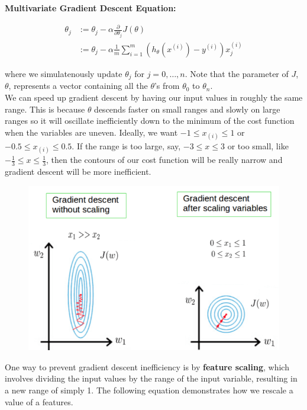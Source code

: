 \documentclass{article}
\begin{document}
        \noindent \textbf{Multivariate Gradient Descent Equation:}

        \begin{align*}
            \theta_j &:= \theta_j-\alpha\frac{\partial}{\partial\theta_j}J(\theta) \\
                     &:= \theta_j-\alpha\frac{1}{m}\sum^m_{i=1}(h_\theta(x^{(i)})-y^{(i)})x_j^{(i)}
        \end{align*}

        \noindent where we simulatenously update $\theta_j$ for $j=0,\dots,n$. Note that the parameter of $J$,
        $\theta$, represents a vector containing all the $\theta$'s from $\theta_0$ to $\theta_n$. \\

        \noindent We can speed up gradient descent by having our input values in roughly the same range. This
        is because $\theta$ descends faster on small ranges and slowly on large ranges so it will oscillate
        inefficiently down to the minimum of the cost function when the variables are uneven. Ideally, we want
        $-1\leq x_{(i)}\leq 1$ or $-0.5\leq x_{(i)}\leq 0.5$. If the range is too large, say, $-3\leq x\leq 3$
        or too small, like $-\frac{1}{3}\leq x\leq\frac{1}{3}$, then the contours of our cost function will
        be really narrow and gradient descent will be more inefficient.

        \begin{figure}[hbt!]
            \centering
            \includegraphics[scale=0.4]{Resources/Contour3}
        \end{figure}

        \noindent One way to prevent gradient descent inefficiency is by \textbf{feature scaling}, which
        involves dividing the input values by the range of the input variable, resulting in a new range of
        simply 1. The following equation demonstrates how we rescale a value of a features.
\end{document}

